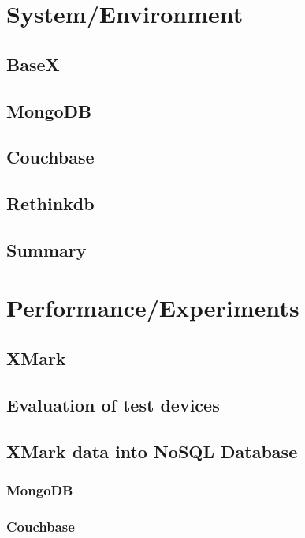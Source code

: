 \documentclass[a4paper,12pt]{article}
\begin{document}
	\section{System/Environment}
		\subsection{BaseX}
			
			
			\newpage
		\subsection{MongoDB}
		\subsection{Couchbase}
		\subsection{Rethinkdb}		
		\subsection{Summary}
	\newpage
	\section{Performance/Experiments}
		\subsection{XMark}
		\label{xmark}
			
		\subsection{Evaluation of test devices}
		\subsection{XMark data into NoSQL Database}
						
			\subsubsection{MongoDB}
			\label{xmark-mongodb}
			
			\subsubsection{Couchbase}
			\label{xmark-couchbase}
			
\end{document}
